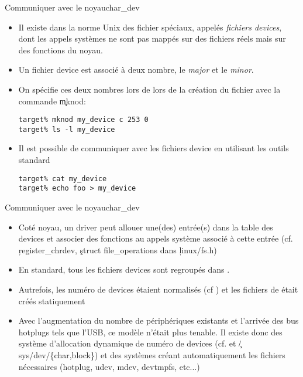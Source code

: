 \begin{frame}[fragile=singleslide]{Communiquer avec le noyau}{char\_dev}
  \begin{itemize} 
  \item Il  existe dans la  norme Unix des fichier  spéciaux, appelés
    \emph{fichiers devices}, dont les appels systèmes ne sont pas mappés
    sur des fichiers réels mais sur des fonctions du noyau.
  \item Un fichier  device est associé à deux  nombre, le \emph{major}
    et le \emph{minor}.
  \item On  spécifie ces deux nombres  lors de lors de  la création du
    fichier avec la commande \c{mknod}:
    \begin{lstlisting} 
target% mknod my_device c 253 0
target% ls -l my_device
    \end{lstlisting} 
  \item Il  est possible  de communiquer avec  les fichiers  device en
    utilisant les outils standard
    \begin{lstlisting} 
target% cat my_device
target% echo foo > my_device
    \end{lstlisting} 
  \end{itemize}
\end{frame}

\begin{frame}[fragile=singleslide]{Communiquer avec le noyau}{char\_dev}
  \begin{itemize} 
  \item Coté noyau, un driver  peut allouer une(des) entrée(s) dans la
    table  des  devices et  associer  des  fonctions  au appels  système
    associé     à    cette    entrée     (cf.     \c{register_chrdev},
    \c{struct file_operations} dans \c{linux/fs.h})
  \item  En standard, tous  les fichiers  devices sont  regroupés dans
    .
  \item  Autrefois,  les  numéro  de devices  étaient  normalisés  (cf
    )  et les fichiers  de 
    était créés statiquement
  \item Avec  l'augmentation du  nombre de périphériques  existants et
    l'arrivée des bus  hotplugs tels que l'USB, ce  modèle n'était plus
    tenable.  Il existe  donc  des système  d'allocation dynamique  de
    numéro     de      devices     (cf.          et
    \c{/sys/dev/\{char,block\}})     et    des     systèmes    créant
    automatiquement  les fichiers  nécessaires  (hotplug, udev,  mdev,
    devtmpfs, etc...)
  \end{itemize}
\end{frame}

